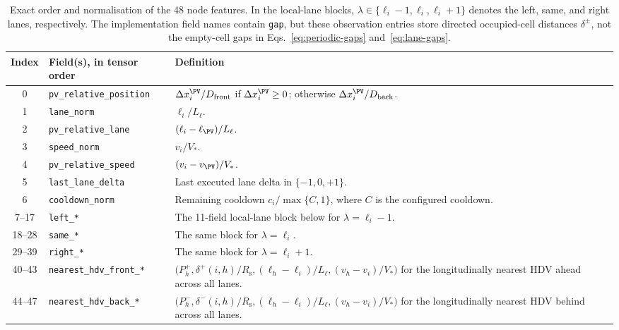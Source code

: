 \begin{table}[t]
\centering
\caption{Exact order and normalisation of the 48 node features. In the local-lane blocks, $\lambda\in\{\ell_i-1,\ell_i,\ell_i+1\}$ denotes the left, same, and right lanes, respectively. The implementation field names contain \texttt{gap}, but these observation entries store directed occupied-cell distances $\delta^\pm$, not the empty-cell gaps in Eqs.~\eqref{eq:periodic-gaps} and~\eqref{eq:lane-gaps}.}
\label{tab:node-schema}
\begingroup
\scriptsize
\setlength{\tabcolsep}{3pt}
\begin{tabular}{@{}cP{0.30\textwidth}P{0.58\textwidth}@{}}
\toprule
Index & Field(s), in tensor order & Definition \\
 & \texttt{pv\_relative\_position} & $\Delta x_i^{\PV}/D_{\mathrm{front}}$ if $\Delta x_i^{\PV}\geq0$; otherwise $\Delta x_i^{\PV}/D_{\mathrm{back}}$. \\
1 & \texttt{lane\_norm} & $\ell_i/L_\ell$. \\
2 & \texttt{pv\_relative\_lane} & $(\ell_i-\ell_{\PV})/L_\ell$. \\
3 & \texttt{speed\_norm} & $v_i/V_*$. \\
4 & \texttt{pv\_relative\_speed} & $(v_i-v_{\PV})/V_*$. \\
5 & \texttt{last\_lane\_delta} & Last executed lane delta in $\{-1,0,+1\}$. \\
6 & \texttt{cooldown\_norm} & Remaining cooldown $c_i/\max\{C,1\}$, where $C$ is the configured cooldown. \\
7--17 & \texttt{left\_*} & The 11-field local-lane block below for $\lambda=\ell_i-1$. \\
18--28 & \texttt{same\_*} & The same block for $\lambda=\ell_i$. \\
29--39 & \texttt{right\_*} & The same block for $\lambda=\ell_i+1$. \\
40--43 & \texttt{nearest\_hdv\_front\_*} & $\bigl(P_h^+,\delta^+(i,h)/R_{\mathrm{s}},(\ell_h-\ell_i)/L_\ell,(v_h-v_i)/V_*\bigr)$ for the longitudinally nearest HDV ahead across all lanes. \\
44--47 & \texttt{nearest\_hdv\_back\_*} & $\bigl(P_h^-,\delta^-(i,h)/R_{\mathrm{s}},(\ell_h-\ell_i)/L_\ell,(v_h-v_i)/V_*\bigr)$ for the longitudinally nearest HDV behind across all lanes. \\
\bottomrule
\end{tabular}
\endgroup
\end{table}
